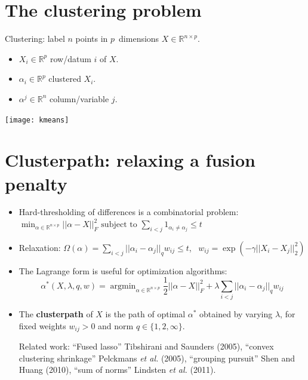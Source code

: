 \documentclass[]{posterDIGITEO}
\newcommand{\RR}{\mathbb R}
\begin{document}
\begin{multicols}{2}

\section{The clustering problem}
\vspace{-0.5in}
\begin{minipage}{0.45\columnwidth}
\raggedright
  Clustering: label $n$ points in $p$~dimensions
    $X\in\RR^{n\times p}$.
\begin{itemize}
\item  $X_i\in\RR^p$ row/datum $i$ of $X$.
\item $\alpha_i\in\RR^p$ clustered $X_i$.
\item $\alpha^j\in\RR^n$ column/variable $j$.
\end{itemize}
\end{minipage}
\begin{minipage}{0.5\columnwidth}
% 
\texttt{[image: kmeans]}
\end{minipage} 
\vspace{-1in}
\section{Clusterpath: relaxing a fusion penalty}
\begin{itemize}
\item Hard-thresholding of differences is a combinatorial problem:
$
 \min_{    \alpha\in\RR^{n\times p}}       ||\alpha-X||_F^2 \text{  subject to  }
\sum_{i<j}1_{\alpha_i\neq\alpha_j} \leq t$
\item Relaxation: $\Omega(\alpha)=\sum_{i<j}||\alpha_i-\alpha_j||_q
  w_{ij}\leq t$, \ {\small $w_{ij} = \exp(-\gamma||X_i-X_j||^2_2)$}
  
 

 \vspace{-0.5in}
\item The Lagrange form is useful for optimization algorithms:
$$
\alpha^*(X,\lambda,q,w)=\operatorname{argmin}_{\alpha\in\RR^{n\times p}}
\frac 1 2||\alpha-X||_F^2+\lambda\sum_{i<j}||\alpha_i-\alpha_j||_q w_{ij}
$$ 
\item The \textbf{clusterpath} of $X$ is the path of optimal
  $\alpha^*$ obtained by varying $\lambda$, for fixed weights
  $w_{ij}>0$ and norm $q\in\{1,2,\infty\}$.



 {\small 
Related work:
``Fused lasso'' Tibshirani and Saunders (2005), 
``convex clustering shrinkage'' Pelckmans \emph{et al.} (2005),
``grouping pursuit'' Shen and Huang (2010),
``sum of norms'' Lindsten \emph{et al.}  (2011).
}
\end{itemize} 


\end{multicols}
\end{document}
